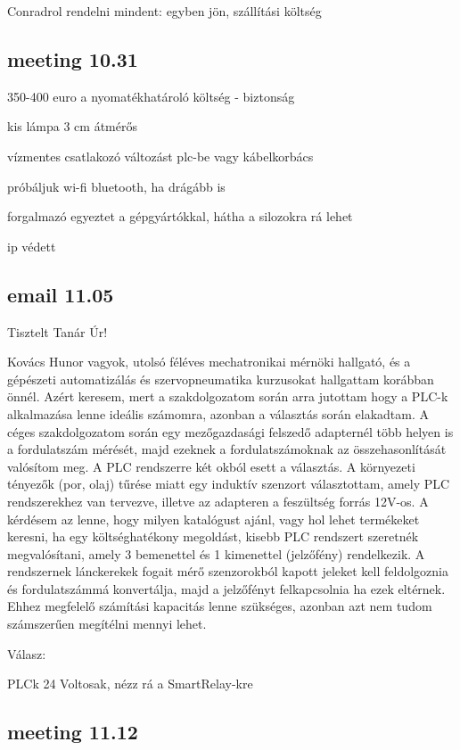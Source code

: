 \documentclass{article}
\begin{document}
	Conradrol rendelni mindent: egyben jön, szállítási költség	
	
	\subsection{meeting 10.31}
	
	350-400 euro a nyomatékhatároló
	költség - biztonság
	
	kis lámpa 3 cm átmérős 
	
	vízmentes csatlakozó változást
	plc-be vagy kábelkorbács
	
	próbáljuk wi-fi bluetooth, ha drágább is
	
	forgalmazó egyeztet a gépgyártókkal, hátha a silozokra rá lehet
	
	ip védett
	
	\subsection{email 11.05}
	
	Tisztelt Tanár Úr!
	
	Kovács Hunor vagyok, utolsó féléves mechatronikai mérnöki hallgató, és a gépészeti automatizálás és szervopneumatika kurzusokat hallgattam korábban önnél. Azért keresem, mert a szakdolgozatom során arra jutottam hogy a PLC-k alkalmazása lenne ideális számomra, azonban a választás során elakadtam.
	A céges szakdolgozatom során egy mezőgazdasági felszedő adapternél több helyen is a fordulatszám mérését, majd ezeknek a fordulatszámoknak az összehasonlítását valósítom meg. A PLC rendszerre két okból esett a választás. A környezeti tényezők (por, olaj) tűrése miatt egy induktív szenzort választottam, amely PLC rendszerekhez van tervezve, illetve az adapteren a feszültség forrás 12V-os.
	A kérdésem az lenne, hogy milyen katalógust ajánl, vagy hol lehet termékeket keresni, ha egy költséghatékony megoldást, kisebb PLC rendszert szeretnék megvalósítani, amely 3 bemenettel és 1 kimenettel (jelzőfény) rendelkezik. 
	A rendszernek lánckerekek fogait mérő szenzorokból kapott jeleket kell feldolgoznia és fordulatszámmá konvertálja, majd a jelzőfényt felkapcsolnia ha ezek eltérnek. Ehhez megfelelő számítási kapacitás lenne szükséges, azonban azt nem tudom számszerűen megítélni mennyi lehet.


	Válasz:
	
	PLCk 24 Voltosak, nézz rá a SmartRelay-kre
	
	\subsection{meeting 11.12}
	
\end{document}
